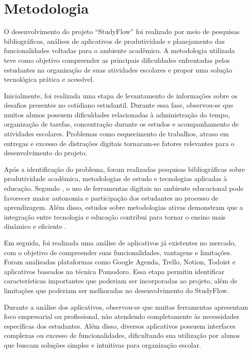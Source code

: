 \documentclass[12pt]{article}
\begin{document}
\section{Metodologia}
O desenvolvimento do projeto “StudyFlow” foi realizado por meio de pesquisas bibliográficas, análises de aplicativos de produtividade e planejamento das funcionalidades voltadas para o ambiente acadêmico. A metodologia utilizada teve como objetivo compreender as principais dificuldades enfrentadas pelos estudantes na organização de suas atividades escolares e propor uma solução tecnológica prática e acessível.

Inicialmente, foi realizada uma etapa de levantamento de informações sobre os desafios presentes no cotidiano estudantil. Durante essa fase, observou-se que muitos alunos possuem dificuldades relacionadas à administração do tempo, organização de tarefas, concentração durante os estudos e acompanhamento de atividades escolares. Problemas como esquecimento de trabalhos, atraso em entregas e excesso de distrações digitais tornaram-se fatores relevantes para o desenvolvimento do projeto.

Após a identificação do problema, foram realizadas pesquisas bibliográficas sobre produtividade acadêmica, metodologias de estudo e tecnologias aplicadas à educação. Segundo , o uso de ferramentas digitais no ambiente educacional pode favorecer maior autonomia e participação dos estudantes no processo de aprendizagem. Além disso, estudos sobre metodologias ativas demonstram que a integração entre tecnologia e educação contribui para tornar o ensino mais dinâmico e eficiente \cite{bacich2018}.

Em seguida, foi realizada uma análise de aplicativos já existentes no mercado, com o objetivo de compreender suas funcionalidades, vantagens e limitações. Foram analisadas plataformas como Google Agenda, Trello, Notion, Todoist e aplicativos baseados na técnica Pomodoro. Essa etapa permitiu identificar características importantes que poderiam ser incorporadas ao projeto, além de limitações que poderiam ser melhoradas no desenvolvimento do StudyFlow.

Durante a análise dos aplicativos, observou-se que muitas ferramentas apresentam foco empresarial ou profissional, não atendendo completamente às necessidades específicas dos estudantes. Além disso, diversos aplicativos possuem interfaces complexas ou excesso de funcionalidades, dificultando sua utilização por alunos que buscam soluções simples e intuitivas para organização escolar.
\end{document}
